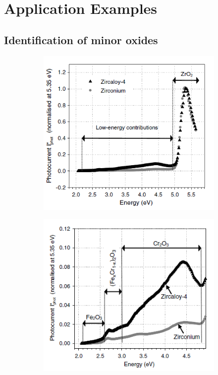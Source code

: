 \section{Application Examples}

\subsection{Identification of minor oxides}


    \renewcommand{\coef}{0.45}
    \begin{figure}[h]
        \centering
        \begin{subfigure}{\coef\textwidth}
            \centering
            \includegraphics[width=\textwidth]{./src/figures/Benaboud2007-Fig4.png}
            \caption{}
            \label{fig:benaboud_minor_oxides_a}
        \end{subfigure}
        \begin{subfigure}{\coef\textwidth}
            \centering
            \includegraphics[width=\textwidth]{./src/figures/Benaboud2007-Fig5.png}

\end{subfigure}
\end{figure}
